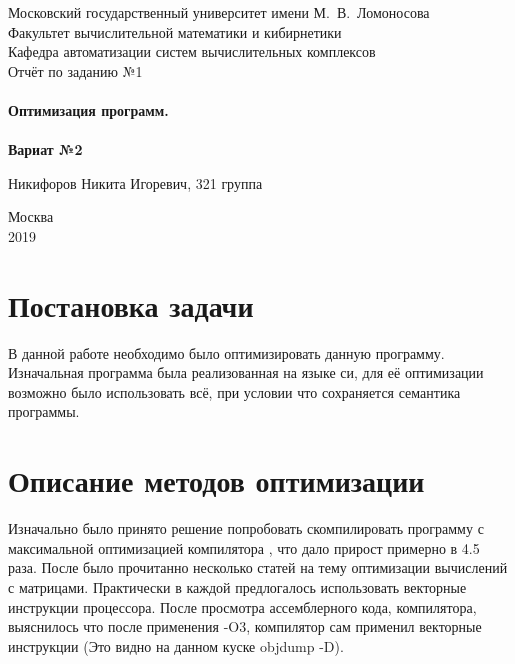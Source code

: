 \documentclass[a4peper, 12pt, titlepage, finall]{extreport}
\begin{document}
    \begin{titlepage}
        \begin{center}
            {\small \sc Московский государственный университет имени М.~В.~Ломоносова\\
            Факультет вычислительной математики и кибирнетики\\
            Кафедра автоматизации систем вычислительных комплексов\\}
            \vfill
            {\large \sc Отчёт по заданию №1}\\~\\

            {\large \bf Оптимизация программ.}\\~\\

            {\large \bf Вариат №2}
        \end{center}
        
        \begin{flushright}
            \vfill
            {Никифоров Никита Игоревич, 321 группа}
        \end{flushright}

        \begin{center}
            \vfill
            {\small Москва\\2019}
        \end{center}
    \end{titlepage}

    \tableofcontents
    \newpage

    \section{Постановка задачи}
        В данной работе необходимо было оптимизировать данную программу. Изначальная программа была реализованная на языке си, для её оптимизации возможно было использовать всё, при условии что сохраняется семантика программы.

    \newpage
    \section{Описание методов оптимизации}
        Изначально было принято решение попробовать скомпилировать программу с максимальной оптимизацией компилятора {}, что дало прирост примерно в 4.5 раза. 
        После было прочитанно несколько статей на тему оптимизации вычислений с матрицами. 
        Практически в каждой предлогалось использовать векторные инструкции процессора. 
        После просмотра ассемблерного кода, компилятора, выяснилось что после применения {\ttfamily -O3}, компилятор сам применил векторные инструкции (Это видно на данном куске {\ttfamily objdump -D}). \\
    
\end{document}
